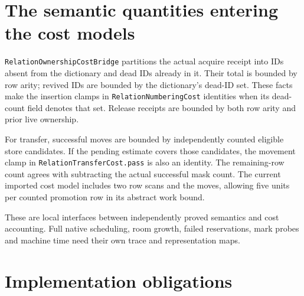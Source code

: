 \documentclass[11pt,a4paper]{article}
\newcommand{\code}[1]{\nolinkurl{#1}}
\begin{document}
\section{The semantic quantities entering the cost models}

\code{RelationOwnershipCostBridge} partitions the actual acquire receipt into
IDs absent from the dictionary and dead IDs already in it. Their total is
bounded by row arity; revived IDs are bounded by the dictionary's dead-ID
set. These facts make the insertion clamps in \code{RelationNumberingCost}
identities when its dead-count field denotes that set. Release receipts are
bounded by both row arity and prior live ownership.

For transfer, successful moves are bounded by independently counted eligible
store candidates. If the pending estimate covers those candidates, the
movement clamp in \code{RelationTransferCost.pass} is also an identity. The
remaining-row count agrees with subtracting the actual successful mask count.
The current imported cost model includes two row scans and the moves, allowing
five units per counted promotion row in its abstract work bound.

These are local interfaces between independently proved semantics and cost
accounting. Full native scheduling, room growth, failed reservations, mark
probes and machine time need their own trace and representation maps.

\section{Implementation obligations}
\end{document}
